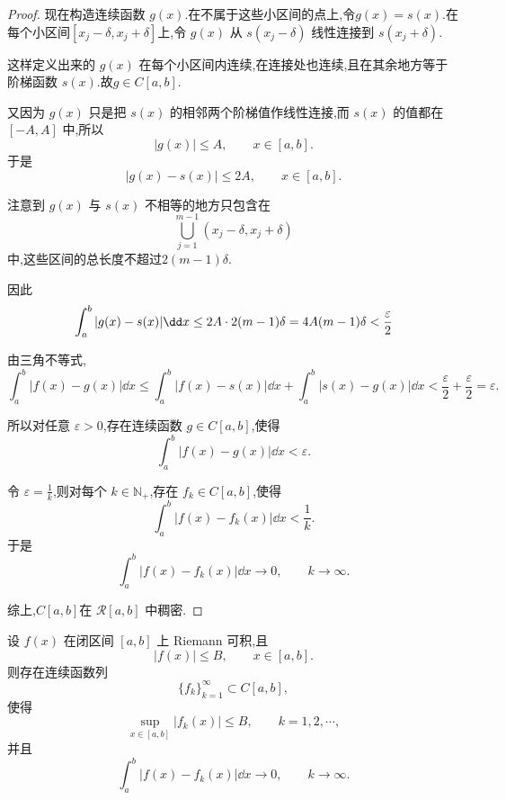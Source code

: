 \begin{proof}
		现在构造连续函数 $g(x)$.在不属于这些小区间的点上,令$g(x)=s(x).$在每个小区间$[x_j-\delta,x_j+\delta]$上,令 $g(x)$ 从 $s(x_j-\delta)$ 线性连接到 $s(x_j+\delta)$.
		
		这样定义出来的 $g(x)$ 在每个小区间内连续,在连接处也连续,且在其余地方等于阶梯函数 $s(x)$.故$g\in C[a,b].$

		又因为 $g(x)$ 只是把 $s(x)$ 的相邻两个阶梯值作线性连接,而 $s(x)$ 的值都在 $[-A,A]$ 中,所以
		\[
		|g(x)|\leq A,\qquad x\in[a,b].
		\]
		于是
		\[
		|g(x)-s(x)|\leq 2A,\qquad x\in[a,b].
		\]
		
		注意到 $g(x)$ 与 $s(x)$ 不相等的地方只包含在
		\[
		\bigcup_{j=1}^{m-1}(x_j-\delta,x_j+\delta)
		\]
		中,这些区间的总长度不超过$2(m-1)\delta.$

		因此
		\[	\int_a^b |g(x)-s(x)|\dd x
			\leq
			2A\cdot 2(m-1)\delta
			=
			4A(m-1)\delta\\
			<
			\frac{\varepsilon}{2}
		\]
		
		由三角不等式,
		\[\int_a^b |f(x)-g(x)|\dd x
			\leq
			\int_a^b |f(x)-s(x)|\dd x
			+
			\int_a^b |s(x)-g(x)|\dd x
			<
			\frac{\varepsilon}{2}+\frac{\varepsilon}{2}
			=
			\varepsilon.
		\]
		
		所以对任意 $\varepsilon>0$,存在连续函数 $g\in C[a,b]$,使得
		\[
		\int_a^b |f(x)-g(x)|\dd x<\varepsilon.
		\]
		
		令 $\varepsilon=\frac1k$,则对每个 $k\in\mathbb{N}_+$,存在 $f_k\in C[a,b]$,使得
		\[
		\int_a^b |f(x)-f_k(x)|\dd x<\frac1k.
		\]
		于是
		\[
		\int_a^b |f(x)-f_k(x)|\dd x\to0,\qquad k\to\infty.
		\]
		
		综上,$C[a,b]$在 $\mathcal{R}[a,b]$ 中稠密.

\end{proof}
\begin{corollary}\label{C在R中一致有界稠密}
	设 $f(x)$ 在闭区间 $[a,b]$ 上 Riemann 可积,且
	\[
	|f(x)|\leq B,\qquad x\in[a,b].
	\]
	则存在连续函数列
	\[
	\{f_k\}_{k=1}^{\infty}\subset C[a,b],
	\]
	使得
	\[
	\sup_{x\in[a,b]}|f_k(x)|\leq B,\qquad k=1,2,\cdots,
	\]
	并且
	\[
	\int_a^b |f(x)-f_k(x)|\dd x\to0,\qquad k\to\infty.
	\]
\end{corollary}

